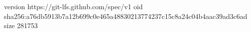version https://git-lfs.github.com/spec/v1
oid sha256:a76db5913b7a12b699c0e465a48830213774237c15c8a24c04b4aac39ad3c6ad
size 281753
